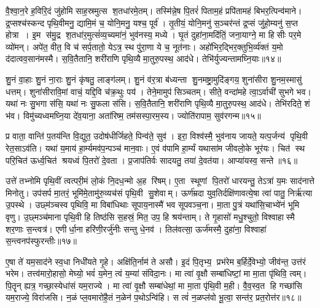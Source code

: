 वै॒श्वा॒न॒रे ह॒विरि॒दं जु॑होमि साह॒स्रमुत्स श॒तधा॑रमे॒तम्। तस्मि॑न्ने॒ष पि॒तरं॑ पिताम॒हं प्रपि॑तामहं बिभर॒त्पिन्व॑माने। द्र॒प्सश्च॑स्कन्द पृथि॒वीमनु॒ द्यामि॒मं च॒ योनि॒मनु॒ यश्च॒ पूर्व॑। तृ॒तीयं॒ योनि॒मनु॑ स॒ञ्चर॑न्तं द्र॒प्सं जु॑हो॒म्यनु॑ स॒प्त होत्रा। इ॒म स॑मु॒द्र श॒तधा॑र॒मुत्सं॑व्य॒च्यमा॑नं॒ भुव॑नस्य॒ मध्ये। घृ॒तं दुहा॑ना॒मदि॑तिं॒ जना॒याग्ने॒ मा हिसीः पर॒मे व्यो॑मन्। अपे॑त॒ वीत॒ वि च॑ सर्प॒तातो॒ येऽत्र॒ स्थ पु॑रा॒णा ये च॒ नूत॑नाः। अहो॑भिर॒द्भिर॒क्तुभि॒र्व्य॑क्तं य॒मो द॑दात्वव॒सान॑मस्मै। स॒वि॒तैतानि॒ शरी॑राणि पृथि॒व्यै मा॒तुरु॒पस्थ॒ आद॑धे। तेभि॑र्युज्यन्तामघ्नि॒याः॥१४॥

शु॒नं वा॒हाः  शु॒नं ना॒राः  शु॒नं कृ॑षतु॒ लाङ्ग॑लम्। शु॒नं व॑र॒त्रा ब॑ध्यन्ता शु॒नमष्ट्रा॒मुदि॑ङ्गय॒ शुना॑सीरा शु॒नम॒स्मासु॑ धत्तम्। शुना॑सीरावि॒मां वाचं॒ यद्दि॒वि च॑क्र॒थुः पय॑। तेने॒मामुप॑ सिञ्चतम्। सीते॒ वन्दा॑महे त्वा॒ऽर्वाची॑ सुभगे भव। यथा॑ नः सु॒भगा स॑सि॒ यथा॑ नः सु॒फला स॑सि। स॒वि॒तैतानि॒ शरी॑राणि पृथि॒व्यै मा॒तुरु॒पस्थ॒ आद॑धे। तेभि॑रदिते॒ शं भ॑व। विमु॑च्यध्वमघ्नि॒या दे॑व॒याना॒ अता॑रिष्म॒ तम॑सस्पा॒रम॒स्य। ज्योति॑रापाम॒ सुव॑रगन्म॥१५॥

प्र वाता॒ वान्ति॑ प॒तय॑न्ति वि॒द्युत॒ उदोष॑धीर्जिहते॒ पिन्व॑ते॒ सुव॑। इरा॒ विश्व॑स्मै॒ भुव॑नाय जायते॒ यत्प॒र्जन्य॑ पृथि॒वी रेत॒साऽव॑ति। यथा॑ य॒माय॑ हा॒र्म्यमव॑प॒न्पञ्च॑ मान॒वाः। ए॒वं व॑पामि हा॒र्म्यं यथासा॑म जीवलो॒के भूर॑यः। चित॑ स्थ परि॒चित॑ ऊर्ध्व॒चित॑  श्रयध्वं पि॒तरो॑ दे॒वता। प्र॒जाप॑तिर्वः सादयतु॒ तया॑ दे॒वत॑या। आप्या॑यस्व॒ सन्ते॥१६॥
\anuvakamend[अ॒घ्नि॒या अ॑गन्म स॒प्त च॑]

उत्ते॑ तभ्नोमि पृथि॒वीं त्वत्परी॒मं लो॒कं नि॒दध॒न्मो अ॒ह रि॑षम्। ए॒ता स्थूणां पि॒तरो॑ धारयन्तु॒ तेऽत्रा॑ य॒मः साद॑नात्ते मिनोतु। उप॑सर्प मा॒तरं॒ भूमि॑मे॒तामु॑रु॒व्यच॑सं पृथि॒वी सु॒शेवाम्। ऊर्ण॑म्रदा युव॒तिर्दक्षि॑णावत्ये॒षा त्वा॑ पातु॒ निर्\mbox{}ऋ॑त्या उ॒पस्थे। उछ्म॑ञ्चस्व पृथिवि॒ मा विबा॑धिथाः सूपाय॒नास्मै॑ भव सूपवञ्च॒ना। मा॒ता पु॒त्रं यथा॑सि॒चाभ्ये॑नं भूमि वृणु। उ॒छ्मञ्च॑माना पृथि॒वी हि तिष्ठ॑सि स॒हस्रं॒ मित॒ उप॒ हि श्रय॑न्ताम्। ते गृ॒हासो॑ मधु॒श्चुतो॒ विश्वाहास्मै शर॒णाः स॒न्त्वत्र॑। एणीर्धा॒ना हरि॑णी॒रर्जु॑नीः सन्तु धे॒नव॑। तिल॑वत्सा॒ ऊर्ज॑मस्मै॒ दुहा॑ना॒ विश्वाहा॑ स॒न्त्वनप॑स्फुरन्तीः॥१७॥

ए॒षा ते॑ यम॒साद॑ने स्व॒धा निधी॑यते गृ॒हे। अक्षि॑ति॒र्नाम॑ ते असौ। इ॒दं पि॒तृभ्य॒ प्रभ॑रेम ब॒र्\mbox{}हिर्दे॒वेभ्यो॒ जीव॑न्त॒ उत्त॑रं भरेम। तत्त्व॑मारो॒हासो॒ मेघ्यो॒ भवं॑ य॒मेन॒ त्वं य॒म्या॑ संविदा॒नः। मा त्वा॑ वृ॒क्षौ सम्बा॑धिष्टां॒ मा मा॒ता पृ॑थिवि॒ त्वम्। पि॒तॄन् ह्यत्र॒ गच्छा॒स्येधा॑सं यम॒राज्ये। मा त्वा॑ वृ॒क्षौ सम्बा॑धेथां॒ मा मा॒ता पृ॑थि॒वी म॒ही। वै॒व॒स्व॒त हि गच्छा॑सि यम॒राज्ये॒ विरा॑जसि। न॒ळं प्ल॒वमारो॑है॒तं न॒ळेन॑ प॒थोऽन्वि॑हि। स त्वं॑ न॒ळप्ल॑वो भू॒त्वा॒ सन्त॑र॒ प्रत॒रोत्त॑र॥१८॥

